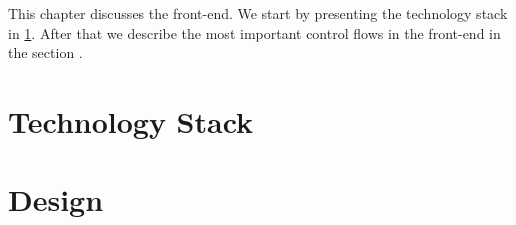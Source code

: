 This chapter discusses the front-end. We start by presenting the technology stack in \cref{sec:1:technologyStack}. After that we describe the most important control flows in the front-end in the section .

\section{Technology Stack}
\label{sec:1:technologyStack}
	

\section{Design}
\label{sec:1:design}
	